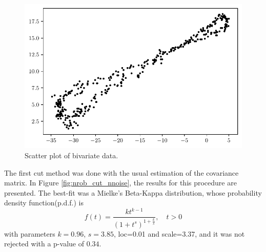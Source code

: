 \documentclass[11pt]{article}
\theoremstyle{definition}
\theoremstyle{remark}
\theoremstyle{remark}
\begin{document}
\begin{figure}[H]
  \centering \includegraphics[scale=.5]{../figs/scatter.pdf}
  \caption{Scatter plot of bivariate data.}
  \label{fig:scatter}
\end{figure}

The first cut method was done with the usual estimation of the
covariance matrix. In Figure \ref{fig:nrob_cut_nnoise}, the results
for this procedure are presented. The best-fit was a Mielke's
Beta-Kappa distribution, whose probability density function(p.d.f.) is
\[
f(t)=\dfrac{kt^{k-1}}{(1+t^s)^{1+\frac{k}{s}}},\quad t>0
\]
with parameters $k=0.96$, $s=3.85$, loc=0.01 and scale=3.37, and it
was not rejected with a p-value of $0.34$.
\end{document}
